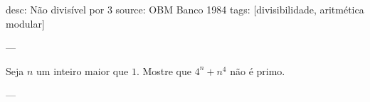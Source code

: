 desc: Não divisível por $3$
source:  OBM Banco 1984
tags:  [divisibilidade, aritmética modular]

---

Seja $n$ um inteiro maior que $1$. Mostre que $4^n + n^4$ não é primo.

---

